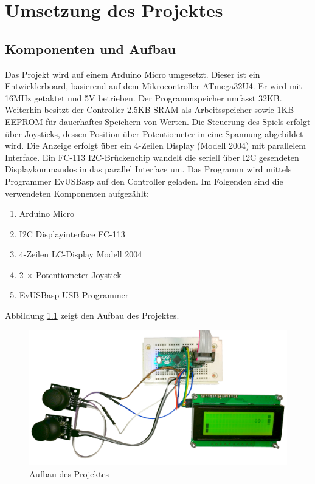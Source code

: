 \chapter{Umsetzung des Projektes}
\section{Komponenten und Aufbau}
\label{sec:Peri}
Das Projekt wird auf einem Arduino Micro umgesetzt. Dieser ist ein Entwicklerboard, basierend auf dem Mikrocontroller ATmega32U4. Er wird mit 16MHz getaktet und 5V betrieben. Der Programmspeicher umfasst 32KB. Weiterhin besitzt der Controller 2.5KB SRAM als Arbeitsspeicher sowie 1KB EEPROM für dauerhaftes Speichern von Werten.
Die Steuerung des Spiels erfolgt über Joysticks, dessen Position über Potentiometer in eine Spannung abgebildet wird. 
Die Anzeige erfolgt über ein 4-Zeilen Display (Modell 2004) mit parallelem Interface. Ein FC-113 I2C-Brückenchip wandelt die seriell über I2C gesendeten Displaykommandos in das parallel Interface um. Das Programm wird mittels Programmer EvUSBasp auf den Controller geladen. Im Folgenden sind die verwendeten Komponenten aufgezählt:
\begin{enumerate}
\item Arduino Micro
\item I2C Displayinterface FC-113 
\item 4-Zeilen LC-Display Modell 2004
\item 2 $\times$ Potentiometer-Joystick
\item EvUSBasp USB-Programmer
\end{enumerate}

Abbildung \ref{fig:Aufbau} zeigt den Aufbau des Projektes.
\begin{figure}[H]
\includegraphics[width=\textwidth]{./Bilder/Aufbau.jpg}
\caption{Aufbau des Projektes}
\label{fig:Aufbau}
\end{figure}

